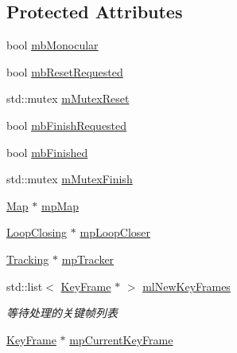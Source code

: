 \subsection*{Protected Attributes}
\begin{DoxyCompactItemize}
\item 
bool \mbox{\hyperlink{class_o_r_b___s_l_a_m2_1_1_local_mapping_a809e1936f5670dba26908ae3cd165f13}{mb\+Monocular}}
\item 
bool \mbox{\hyperlink{class_o_r_b___s_l_a_m2_1_1_local_mapping_ab3d831745749531e0bfa92b59e3da66e}{mb\+Reset\+Requested}}
\item 
std\+::mutex \mbox{\hyperlink{class_o_r_b___s_l_a_m2_1_1_local_mapping_acf229cc6cbbc4e50f0494946038a0ce8}{m\+Mutex\+Reset}}
\item 
bool \mbox{\hyperlink{class_o_r_b___s_l_a_m2_1_1_local_mapping_a761d63d4351faa22012420d635829df1}{mb\+Finish\+Requested}}
\item 
bool \mbox{\hyperlink{class_o_r_b___s_l_a_m2_1_1_local_mapping_a3494232f3f8f3b3dc25dd0da44ad4014}{mb\+Finished}}
\item 
std\+::mutex \mbox{\hyperlink{class_o_r_b___s_l_a_m2_1_1_local_mapping_ae067c33c891cb04e9cb8557ab4d7df33}{m\+Mutex\+Finish}}
\item 
\mbox{\hyperlink{class_o_r_b___s_l_a_m2_1_1_map}{Map}} $\ast$ \mbox{\hyperlink{class_o_r_b___s_l_a_m2_1_1_local_mapping_a7ca97c0d4a6064148315589cc96a3302}{mp\+Map}}
\item 
\mbox{\hyperlink{class_o_r_b___s_l_a_m2_1_1_loop_closing}{Loop\+Closing}} $\ast$ \mbox{\hyperlink{class_o_r_b___s_l_a_m2_1_1_local_mapping_ac71702f1061f82c457276c014eebc784}{mp\+Loop\+Closer}}
\item 
\mbox{\hyperlink{class_o_r_b___s_l_a_m2_1_1_tracking}{Tracking}} $\ast$ \mbox{\hyperlink{class_o_r_b___s_l_a_m2_1_1_local_mapping_a6b4d311f49979f38d47ed96290255a2f}{mp\+Tracker}}
\item 
std\+::list$<$ \mbox{\hyperlink{class_o_r_b___s_l_a_m2_1_1_key_frame}{Key\+Frame}} $\ast$ $>$ \mbox{\hyperlink{class_o_r_b___s_l_a_m2_1_1_local_mapping_a4a365466d11db0f8e8fc14d76fc0cd83}{ml\+New\+Key\+Frames}}
\begin{DoxyCompactList}\small\item\em 等待处理的关键帧列表 \end{DoxyCompactList}\item 
\mbox{\hyperlink{class_o_r_b___s_l_a_m2_1_1_key_frame}{Key\+Frame}} $\ast$ \mbox{\hyperlink{class_o_r_b___s_l_a_m2_1_1_local_mapping_a1e4de53f96e97c6b94b794d0a5bc67e3}{mp\+Current\+Key\+Frame}}

\end{DoxyCompactItemize}
